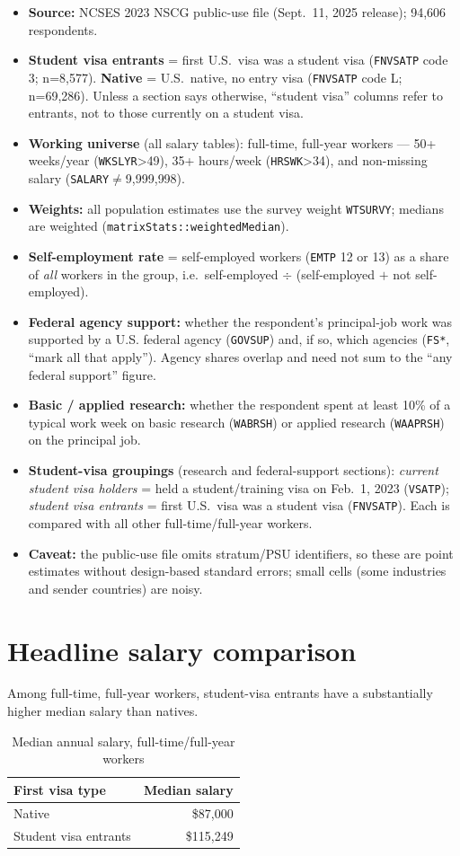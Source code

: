 \documentclass[11pt]{article}
\begin{document}
\begin{itemize}
\item \textbf{Source:} NCSES 2023 NSCG public-use file (Sept.\ 11, 2025 release); 94,606 respondents.
\item \textbf{Student visa entrants} = first U.S.\ visa was a student visa (\texttt{FNVSATP} code 3; n=8,577). \textbf{Native} = U.S.\ native, no entry visa (\texttt{FNVSATP} code L; n=69,286). Unless a section says otherwise, ``student visa'' columns refer to entrants, not to those currently on a student visa.
\item \textbf{Working universe} (all salary tables): full-time, full-year workers --- 50+ weeks/year (\texttt{WKSLYR}>49), 35+ hours/week (\texttt{HRSWK}>34), and non-missing salary (\texttt{SALARY}$\neq$9{,}999{,}998).
\item \textbf{Weights:} all population estimates use the survey weight \texttt{WTSURVY}; medians are weighted (\texttt{matrixStats::weightedMedian}).
\item \textbf{Self-employment rate} = self-employed workers (\texttt{EMTP} 12 or 13) as a share of \emph{all} workers in the group, i.e.\ self-employed $\div$ (self-employed $+$ not self-employed).
\item \textbf{Federal agency support:} whether the respondent's principal-job work was supported by a U.S. federal agency (\texttt{GOVSUP}) and, if so, which agencies (\texttt{FS*}, ``mark all that apply''). Agency shares overlap and need not sum to the ``any federal support'' figure.
\item \textbf{Basic / applied research:} whether the respondent spent at least 10\% of a typical work week on basic research (\texttt{WABRSH}) or applied research (\texttt{WAAPRSH}) on the principal job.
\item \textbf{Student-visa groupings} (research and federal-support sections): \emph{current student visa holders} = held a student/training visa on Feb.\ 1, 2023 (\texttt{VSATP}); \emph{student visa entrants} = first U.S.\ visa was a student visa (\texttt{FNVSATP}). Each is compared with all other full-time/full-year workers.
\item \textbf{Caveat:} the public-use file omits stratum/PSU identifiers, so these are point estimates without design-based standard errors; small cells (some industries and sender countries) are noisy.
\end{itemize}
\section{Headline salary comparison}
Among full-time, full-year workers, student-visa entrants have a substantially higher median salary than natives.
\begin{table}[H]
\centering
\caption{Median annual salary, full-time/full-year workers}

\begin{tabular}{lr}
\toprule
First visa type & Median salary\\
\midrule
Native & \$87,000\\
Student visa entrants & \$115,249\\
\bottomrule
\end{tabular}
\end{table}
\end{document}
